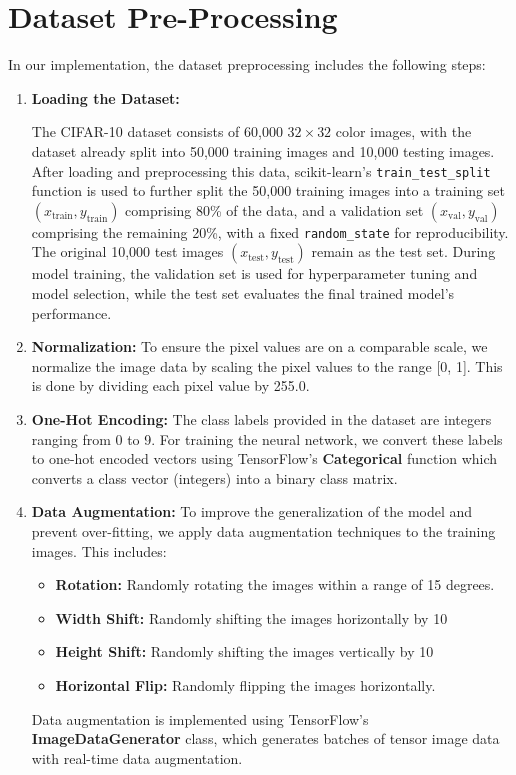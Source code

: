 \documentclass{article}
\begin{document}
\section{Dataset Pre-Processing}
 
In our implementation, the dataset preprocessing includes the following steps:

\begin{enumerate}

    \item \textbf{Loading the Dataset:} 

    The CIFAR-10 dataset consists of 60,000 $32 \times 32$ color images, with the dataset already split into 50,000 training images and 10,000 testing images. After loading and preprocessing this data, scikit-learn's \texttt{train\_test\_split} function is used to further split the 50,000 training images into a training set $(x_{\text{train}}, y_{\text{train}})$ comprising 80\% of the data, and a validation set $(x_{\text{val}}, y_{\text{val}})$ comprising the remaining 20\%, with a fixed \texttt{random\_state} for reproducibility. The original 10,000 test images $(x_{\text{test}}, y_{\text{test}})$ remain as the test set. During model training, the validation set is used for hyperparameter tuning and model selection, while the test set evaluates the final trained model's performance.


    \item \textbf{Normalization:} To ensure the pixel values are on a comparable scale, we normalize the image data by scaling the pixel values to the range [0, 1]. This is done by dividing each pixel value by 255.0.

    \item \textbf{One-Hot Encoding:} The class labels provided in the dataset are integers ranging from 0 to 9. For training the neural network, we convert these labels to one-hot encoded vectors using TensorFlow's \textbf{Categorical} function which converts a class vector (integers) into a binary class matrix.

    \item \textbf{Data Augmentation:} To improve the generalization of the model and prevent over-fitting, we apply data augmentation techniques to the training images. This includes:
    \begin{itemize}
        \item \textbf{Rotation:} Randomly rotating the images within a range of 15 degrees.
        \item \textbf{Width Shift:} Randomly shifting the images horizontally by 10%
        \item \textbf{Height Shift:} Randomly shifting the images vertically by 10%
        \item \textbf{Horizontal Flip:} Randomly flipping the images horizontally.
    \end{itemize}
    Data augmentation is implemented using TensorFlow's \textbf{ImageDataGenerator} class, which generates batches of tensor image data with real-time data augmentation.

\end{enumerate}
\end{document}
